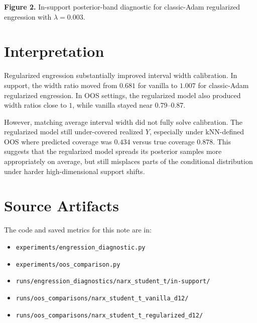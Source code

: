 \documentclass[11pt]{article}
\begin{document}
\noindent\textbf{Figure 2.} In-support posterior-band diagnostic for
classic-Adam regularized engression with \(\lambda=0.003\).

\clearpage
\section{Interpretation}

Regularized engression substantially improved interval width calibration.  In
support, the width ratio moved from \(0.681\) for vanilla to \(1.007\) for
classic-Adam regularized engression.  In OOS settings, the regularized model
also produced width ratios close to \(1\), while vanilla stayed near
\(0.79\)--\(0.87\).

However, matching average interval width did not fully solve calibration.  The
regularized model still under-covered realized \(Y\), especially under
\(\text{kNN}\)-defined OOS where predicted coverage was \(0.434\) versus true
coverage \(0.878\).  This suggests that the regularized model spreads its
posterior samples more appropriately on average, but still misplaces parts of
the conditional distribution under harder high-dimensional support shifts.

\section{Source Artifacts}

The code and saved metrics for this note are in:

\begin{itemize}
  \item \texttt{experiments/engression\_diagnostic.py}
  \item \texttt{experiments/oos\_comparison.py}
  \item \texttt{runs/engression\_diagnostics/narx\_student\_t/in-support/}
  \item \texttt{runs/oos\_comparisons/narx\_student\_t\_vanilla\_d12/}
  \item \texttt{runs/oos\_comparisons/narx\_student\_t\_regularized\_d12/}
\end{itemize}
\end{document}
